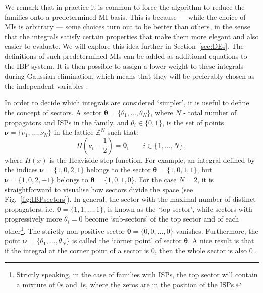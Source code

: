 \documentclass[main.tex]{subfiles}
\begin{document}
We remark that in practice it is common to force the algorithm to reduce the families onto a predetermined MI basis. This is because --- while the choice of MIs is arbitrary --- some choices turn out to be better than others, in the sense that the integrals satisfy certain properties that make them more elegant and also easier to evaluate. We will explore this idea further in Section~\ref{sec:DEs}. The definitions of such predetermined MIs can be added as additional equations to the IBP system. It is then possible to assign a lower weight to these integrals during Gaussian elimination, which means that they will be preferably chosen as the independent variables \cite{Peraro:2019svx}.

In order to decide which integrals are considered `simpler', it is useful to define the concept of sectors. A sector $\bm{\theta} = \{\theta_1, \ldots, \theta_N\}$, where $N$ - total number of propagators and ISPs in the family, and $\theta_i\in \{0, 1\}$, is the set of points $\bm{\nu} = \{\nu_1, \ldots, \nu_N\}$ in the lattice $\mathbb{Z}^N$ such that:
\begin{equation} \label{eq:sectors}
    H \left(\nu_i - \frac{1}{2} \right) = \mathbf{\theta}_i \qquad i \in \{1, \ldots, N\} \,,
\end{equation}
where $H(x)$ is the Heaviside step function. For example, an integral defined by the indices $\bm{\nu} = \{1, 0, 2, 1\}$ belongs to the sector $\bm{\theta} = \{1, 0, 1, 1\}$, but $\bm{\nu} = \{1, 0, 2, -1\}$ belongs to $\bm{\theta} = \{1, 0, 1, 0\}$. For the case $N=2$, it is straightforward to visualise how sectors divide the space (see Fig.~\ref{fig:IBPsectors}). In general, the sector with the maximal number of distinct propagators, i.e. $\bm{\theta} = \{1, 1, \ldots, 1\}$, is known as the `top sector', while sectors with progressively more $\theta_i = 0$ become `sub-sectors' of the top sector and of each other\footnote{Strictly speaking, in the case of families with ISPs, the top sector will contain a mixture of $0$s and $1$s, where the zeros are in the position of the ISPs.}. The strictly non-positive sector $\bm{\theta} = \{0, 0, \ldots, 0\}$ vanishes. Furthermore, the point $\bm{\nu} = \{\theta_1, \ldots, \theta_N\}$ is called the `corner point' of sector $\bm{\theta}$. A nice result is that if the integral at the corner point of a sector is 0, then the whole sector is also 0 \cite{Lee:2008tj}.
\end{document}
